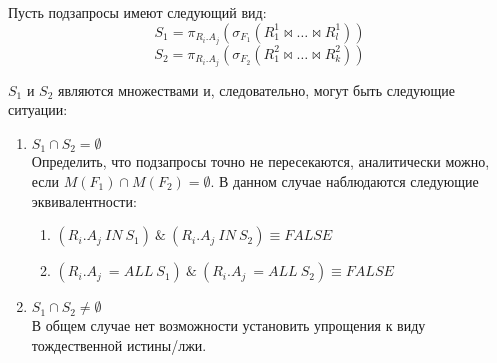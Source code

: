 \documentclass[10pt,a4paper]{article}
\def \n #1{\mathit{#1}}
\begin{document}
Пусть подзапросы имеют следующий вид:
$$S_1 = \pi_{R_i.A_j} (\sigma_{F_1} (R_1^1 \Join \dots \Join R_l^1))$$
$$S_2 = \pi_{R_i.A_j} (\sigma_{F_2} (R_1^2 \Join \dots \Join R_k^2))$$

$S_1$ и $S_2$ являются множествами и, следовательно, могут быть следующие ситуации:
\begin{enumerate}
  \item $S_1 \cap S_2 = \emptyset $\\
  Определить, что подзапросы точно не пересекаются, аналитически можно, если $M(F_1) \cap M(F_2) =
  \emptyset$. В данном случае наблюдаются следующие эквивалентности:
  \begin{enumerate}
    \item $(\n{R_i.A_j}\ \n{IN}\ S_1)\ \&\ (\n{R_i.A_j}\ \n{IN}\ S_2) \equiv \n{FALSE}$
    \item $(\n{R_i.A_j}\ = \n{ALL}\ S_1)\ \&\ (\n{R_i.A_j}\ = \n{ALL}\ S_2) \equiv \n{FALSE}$
  \end{enumerate}
  \item $S_1 \cap S_2 \neq \emptyset $\\
  В общем случае нет возможности установить упрощения к виду тождественной истины/лжи.
\end{enumerate}
\end{document}
